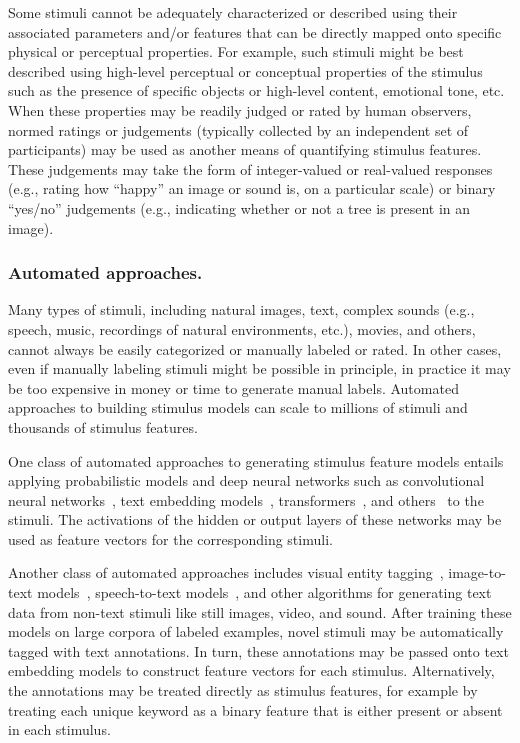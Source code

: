 \documentclass{llmxive}
\begin{document}
Some stimuli cannot be adequately characterized or described using
their associated parameters and/or features that can be directly
mapped onto specific physical or perceptual properties.  For example,
such stimuli might be best described using high-level perceptual or
conceptual properties of the stimulus such as the presence of specific
objects or high-level content, emotional tone, etc.  When these
properties may be readily judged or rated by human observers, normed
ratings or judgements (typically collected by an independent set of
participants) may be used as another means of quantifying stimulus
features.  These judgements may take the form of integer-valued or
real-valued responses (e.g., rating how ``happy'' an image or sound
is, on a particular scale) or binary ``yes/no'' judgements (e.g.,
indicating whether or not a tree is present in an image).


\subsubsection{Automated approaches.}
Many types of stimuli, including natural images, text, complex sounds
(e.g., speech, music, recordings of natural environments, etc.),
movies, and others, cannot always be easily categorized or manually
labeled or rated.  In other cases, even if manually labeling stimuli
might be possible in principle, in practice it may be too expensive in
money or time to generate manual labels.  Automated approaches to
building stimulus models can scale to millions of stimuli and
thousands of stimulus features.

One class of automated approaches to generating stimulus feature
models entails applying probabilistic models and deep neural networks
such as convolutional neural networks~\citep{LeCuBeng95, KrizEtal12},
text embedding models~\citep{DeerEtal90, LandDuma97, NelsEtal04,
  SteyEtal04, BleiEtal03,
  BengEtal03, BrowEtal92, MnihHint09, MikoEtal13a, MikoEtal13b,
  PennEtal14, PeteEtal18, KiroEtal15, CerEtal18, ConnEtal18,
  WietKiel19}, transformers~\citep{DevlEtal18, BrowEtal20,
  RadfEtal19}, and others~\citep{KharEtal21} to the stimuli.  The
activations of the hidden or output layers of these networks may be
used as feature vectors for the corresponding stimuli.

Another class of automated approaches includes visual entity
tagging~\citep{ChenEtal13b}, image-to-text models~\citep{StonEtal18,
  BaboEtal11, deAnEtal18}, speech-to-text models~\citep{FuruEtal04,
  JoneEtal03, ZimaEtal18, WilpEtal90}, and other algorithms for
generating text data from non-text stimuli like still images, video,
and sound.  After training these models on large corpora of labeled
examples, novel stimuli may be automatically tagged with text
annotations.  In turn, these annotations may be passed onto text
embedding models to construct feature vectors for each stimulus.
Alternatively, the annotations may be treated directly as stimulus
features, for example by treating each unique keyword as a binary
feature that is either present or absent in each stimulus.
\end{document}
